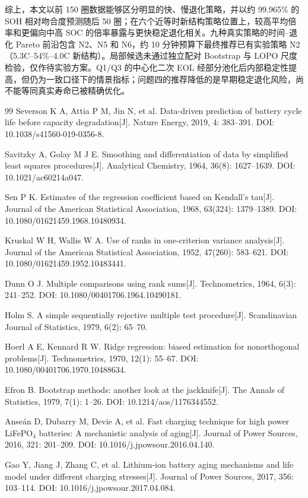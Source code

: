 \documentclass[withoutpreface]{cumcmthesis}
\begin{document}
综上，本文以前 150 圈数据能够区分明显的快、慢退化策略，并以约 99.965\% 的 SOH 相对吻合度预测随后 50 圈；在六个近等时新结构策略位置上，较高平均倍率和更偏向中高 SOC 的倍率暴露与更快稳定退化相关。九种真实策略的时间--退化 Pareto 前沿包含 N2、N5 和 N6，约 10 分钟预算下最终推荐已有实验策略 N2（5.3C--54\%--4.0C 新结构）。局部候选未通过独立配对 Bootstrap 与 LOPO 尺度检验，仅作待实验方案。Q1/Q3 的中心化二次 EOL 经部分池化后内部稳定性提高，但仍为一致口径下的情景指标；问题四的推荐降低的是早期稳定退化风险，尚不能等同真实寿命已被精确优化。

\begin{thebibliography}{99}
Severson K A, Attia P M, Jin N, et al. Data-driven prediction of battery cycle life before capacity degradation[J]. Nature Energy, 2019, 4: 383--391. DOI: 10.1038/s41560-019-0356-8.

Savitzky A, Golay M J E. Smoothing and differentiation of data by simplified least squares procedures[J]. Analytical Chemistry, 1964, 36(8): 1627--1639. DOI: 10.1021/ac60214a047.

Sen P K. Estimates of the regression coefficient based on Kendall's tau[J]. Journal of the American Statistical Association, 1968, 63(324): 1379--1389. DOI: 10.1080/01621459.1968.10480934.

Kruskal W H, Wallis W A. Use of ranks in one-criterion variance analysis[J]. Journal of the American Statistical Association, 1952, 47(260): 583--621. DOI: 10.1080/01621459.1952.10483441.

Dunn O J. Multiple comparisons using rank sums[J]. Technometrics, 1964, 6(3): 241--252. DOI: 10.1080/00401706.1964.10490181.

Holm S. A simple sequentially rejective multiple test procedure[J]. Scandinavian Journal of Statistics, 1979, 6(2): 65--70.

Hoerl A E, Kennard R W. Ridge regression: biased estimation for nonorthogonal problems[J]. Technometrics, 1970, 12(1): 55--67. DOI: 10.1080/00401706.1970.10488634.

Efron B. Bootstrap methods: another look at the jackknife[J]. The Annals of Statistics, 1979, 7(1): 1--26. DOI: 10.1214/aos/1176344552.

Anse\'an D, Dubarry M, Devie A, et al. Fast charging technique for high power LiFePO$_4$ batteries: A mechanistic analysis of aging[J]. Journal of Power Sources, 2016, 321: 201--209. DOI: 10.1016/j.jpowsour.2016.04.140.

Gao Y, Jiang J, Zhang C, et al. Lithium-ion battery aging mechanisms and life model under different charging stresses[J]. Journal of Power Sources, 2017, 356: 103--114. DOI: 10.1016/j.jpowsour.2017.04.084.
\end{thebibliography}
\end{document}
